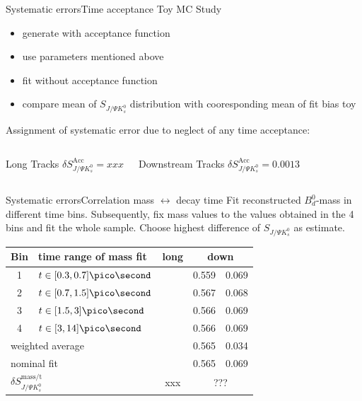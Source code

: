 \documentclass{beamer}
\newcommand{\Bd}{$B_d^0$}
\newcommand{\SJPsi}{S_{J/\Psi K_s^0}}
\begin{document}
\begin{frame}{Systematic errors}{Time acceptance}
Toy MC Study
\begin{itemize}
\item generate with acceptance function 
\item use parameters mentioned above
\item fit without acceptance function
\item compare mean of $\SJPsi$ distribution with cooresponding mean of fit bias toy
\end{itemize}

Assignment of systematic error due to neglect of any time acceptance:
	\begin{columns}
	\begin{block}{Long Tracks}
    \centering
        $\delta\SJPsi^{\text{Acc}} = xxx$
    \end{block}
	\begin{block}{Downstream Tracks}
    \centering
        $\delta\SJPsi^{\text{Acc}} = 0.0013$
    \end{block}
    \end{columns}


\end{frame}

\begin{frame}{Systematic errors}{Correlation mass $\leftrightarrow$ decay time}
Fit reconstructed \Bd-mass in different time bins. Subsequently, fix mass values to the values obtained in the 4 bins and fit the whole sample. Choose highest difference of $\SJPsi$ as estimate.
\begin{center}
\begin{tabular}{c l r@{$\pm$}l r@{$\pm$}l}
\hline \hline
Bin & time range of mass fit & \multicolumn{2}{c}{long} & \multicolumn{2}{c}{down} \\ \hline
1 & $t \in [0.3, 0.7] \pico\second$ & & & 0.559 & 0.069 \\
2 & $t \in [0.7, 1.5] \pico\second$ & & & 0.567 & 0.068 \\
3 & $t \in [1.5, 3] \pico\second$ & & & 0.566 & 0.069 \\
4 & $t \in [3, 14] \pico\second$ & & & 0.566 & 0.069 \\ \hline
\multicolumn{2}{l}{weighted average}  & & & 0.565 & 0.034 \\ \hline
\multicolumn{2}{l}{nominal fit}  & & & 0.565 & 0.069 \\ \hline
\multicolumn{2}{l}{$\delta\SJPsi^{\text{mass/t}}$} & \multicolumn{2}{c}{xxx} & \multicolumn{2}{c}{???} \\

\hline \hline
\end{tabular}
\end{center}
\end{frame}
\end{document}
